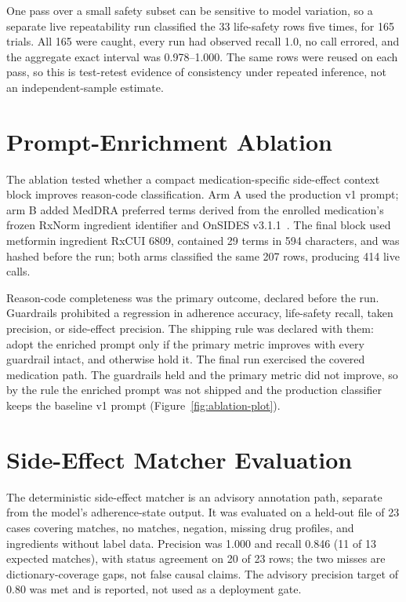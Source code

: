 One pass over a small safety subset can be sensitive to model variation, so a
separate live repeatability run classified the 33 life-safety rows five times,
for 165 trials. All 165 were caught, every run had observed recall 1.0, no call
errored, and the aggregate exact interval was 0.978--1.000. The same rows were
reused on each pass, so this is test-retest evidence of consistency under
repeated inference, not an independent-sample estimate.

\section{Prompt-Enrichment Ablation}

The ablation tested whether a compact medication-specific side-effect context
block improves reason-code classification. Arm A used the production v1 prompt;
arm B added MedDRA preferred terms derived from the enrolled medication's frozen
RxNorm ingredient identifier and OnSIDES v3.1.1~\cite{tanaka2025onsides}. The
final block used metformin ingredient RxCUI 6809, contained 29 terms in 594
characters, and was hashed before the run; both arms classified the same 207
rows, producing 414 live calls.

Reason-code completeness was the primary outcome, declared before the run.
Guardrails prohibited a regression in adherence accuracy, life-safety recall,
taken precision, or side-effect precision. The shipping rule was declared with
them: adopt the enriched prompt only if the primary metric improves with every
guardrail intact, and otherwise hold it. The final run exercised the covered
medication path. The guardrails held and the primary metric did not improve, so
by the rule the enriched prompt was not shipped and the production classifier
keeps the baseline v1 prompt (Figure~\ref{fig:ablation-plot}).


\section{Side-Effect Matcher Evaluation}

The deterministic side-effect matcher is an advisory annotation path, separate
from the model's adherence-state output. It was evaluated on a held-out file of
23 cases covering matches, no matches, negation, missing drug profiles, and
ingredients without label data. Precision was 1.000 and recall 0.846 (11 of 13
expected matches), with status agreement on 20 of 23 rows; the two misses are
dictionary-coverage gaps, not false causal claims. The advisory precision target
of 0.80 was met and is reported, not used as a deployment gate.
